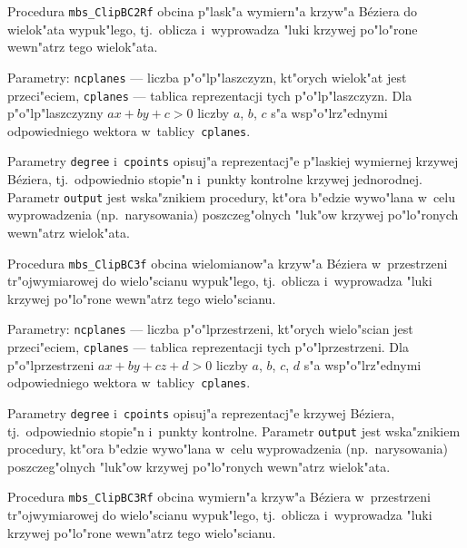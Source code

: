\vspace{\bigskipamount}
Procedura \texttt{mbs\_ClipBC2Rf} obcina p"lask"a wymiern"a krzyw"a
B\'{e}ziera do wielok"ata wypuk"lego, tj.\ oblicza i~wyprowadza "luki
krzywej po"lo"rone wewn"atrz tego wielok"ata.

Parametry: \texttt{ncplanes} --- liczba p"o"lp"laszczyzn, kt"orych
wielok"at jest przeci"eciem, \texttt{cplanes} --- tablica reprezentacji
tych p"o"lp"laszczyzn. Dla p"o"lp"laszczyzny $ax+by+c>0$ liczby
$a$, $b$, $c$ s"a wsp"o"lrz"ednymi odpowiedniego wektora
w~tab\-li\-cy~\texttt{cplanes}.

Parametry \texttt{degree} i~\texttt{cpoints} opisuj"a reprezentacj"e p"laskiej
wymiernej krzywej B\'{e}ziera, tj.\ odpowiednio stopie"n i~punkty kontrolne
krzywej jednorodnej.
Parametr \texttt{output} jest wska"znikiem procedury, kt"ora b"edzie wywo"lana
w~celu wyprowadzenia (np.\ narysowania) poszczeg"olnych "luk"ow krzywej
po"lo"ronych wewn"atrz wielok"ata.

\vspace{\bigskipamount}
Procedura \texttt{mbs\_ClipBC3f} obcina wielomianow"a krzyw"a B\'{e}ziera
w~przestrzeni tr"ojwymiarowej do wielo"scianu wypuk"lego, tj.\ oblicza
i~wyprowadza "luki krzywej po"lo"rone wewn"atrz tego wielo"scianu.

Parametry: \texttt{ncplanes} --- liczba p"o"lprzestrzeni, kt"orych
wielo"scian jest przeci"eciem, \texttt{cplanes} --- tablica reprezentacji
tych p"o"lprzestrzeni. Dla p"o"lprzestrzeni $ax+by+cz+d>0$ liczby
$a$, $b$, $c$, $d$ s"a wsp"o"lrz"ednymi odpowiedniego wektora
w~tab\-li\-cy~\texttt{cplanes}.

Parametry \texttt{degree} i~\texttt{cpoints} opisuj"a reprezentacj"e
krzywej B\'{e}ziera, tj.\ odpowiednio stopie"n i~punkty kontrolne.
Parametr \texttt{output} jest wska"znikiem procedury, kt"ora b"edzie wywo"lana
w~celu wyprowadzenia (np.\ narysowania) poszczeg"olnych "luk"ow krzywej
po"lo"ronych wewn"atrz wielok"ata.

\vspace{\bigskipamount}
Procedura \texttt{mbs\_ClipBC3Rf} obcina wymiern"a krzyw"a B\'{e}ziera
w~przestrzeni tr"ojwymiarowej do wielo"scianu wypuk"lego, tj.\ oblicza
i~wyprowadza "luki krzywej po"lo"rone wewn"atrz tego wielo"scianu.

